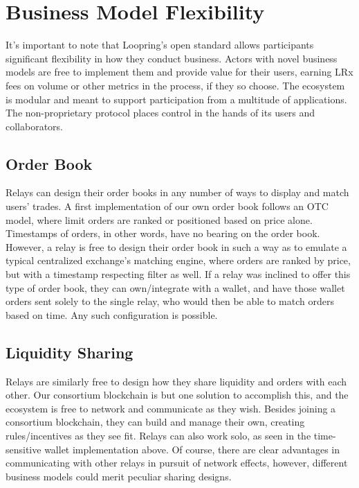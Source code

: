 \documentclass[UTF8,nofonts]{article}
\begin{document}
\begin{enumerate}
\end{enumerate}


\section{Business Model Flexibility}
It's important to note that Loopring's open standard allows participants significant flexibility in how they conduct business. Actors with novel business models are free to implement them and provide value for their users, earning LRx fees on volume or other metrics in the process, if they so choose. The ecosystem is modular and meant to support participation from a multitude of applications. The non-proprietary protocol places control in the hands of its users and collaborators.

\subsection{Order Book}
Relays can design their order books in any number of ways to display and match users' trades. A first implementation of our own order book follows an OTC model, where limit orders are ranked or positioned based on price alone. Timestamps of orders, in other words, have no bearing on the order book. However, a relay is free to design their order book in such a way as to emulate a typical centralized exchange's matching engine, where orders are ranked by price, but with a timestamp respecting filter as well. If a relay was inclined to offer this type of order book, they can own/integrate with a wallet, and have those wallet orders sent solely to the single relay, who would then be able to match orders based on time. Any such configuration is possible. 

\subsection{Liquidity Sharing}
Relays are similarly free to design how they share liquidity and orders with each other. Our consortium blockchain is but one solution to accomplish this, and the ecosystem is free to network and communicate as they wish. Besides joining a consortium blockchain, they can build and manage their own, creating rules/incentives as they see fit. Relays can also work solo, as seen in the time-sensitive wallet implementation above. Of course, there are clear advantages in communicating with other relays in pursuit of network effects, however, different business models could merit peculiar sharing designs. 
\end{document}
